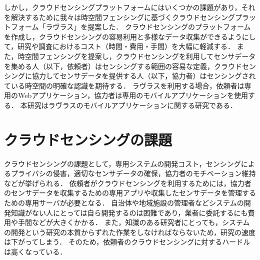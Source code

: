 しかし，クラウドセンシングプラットフォームにはいくつかの課題があり，それを解決するために我々は時空間フェンシングに基づくクラウドセンシングプラットフォーム「ラヴラス」を提案した．
クラウドセンシングのプラットフォームを作成し，クラウドセンシングの容易利用と多様なデータ収集ができるようにして，研究や調査におけるコスト（時間・費用・手間）を大幅に軽減する．
また，時空間フェンシングを提案し，クラウドセンシングを利用してセンサデータを集める人（以下，依頼者）はセンシングする範囲の容易な定義，クラウドセンシングに協力してセンサデータを提供する人（以下，協力者）はセンシングされている時空間の明確な認識を期待する．
ラヴラスを利用する場合，依頼者は専用のWebアプリケーション，協力者は専用のモバイルアプリケーションを使用する．
本研究はラヴラスのモバイルアプリケーションに関する研究である．



\section{クラウドセンシングの課題}

クラウドセンシングの課題として，専用システムの開発コスト，センシングによるプライバシの侵害，適切なセンサデータの確保，協力者のモチベーション維持などが挙げられる．
依頼者がクラウドセンシングを利用するためには，協力者のセンサデータを収集するための専用アプリや収集したセンサデータを管理するための専用サーバが必要となる．
自治体や地域施設の管理者などシステムの開発知識がない人にとっては自ら開発するのは困難であり，業者に委託するにも費用や手間などが大きくかかる．
また，知識のある研究者にとっても，システムの開発という研究の本質からずれた作業をしなければならないため，研究の速度は下がってしまう．
そのため，依頼者のクラウドセンシングに対するハードルは高くなっている．

